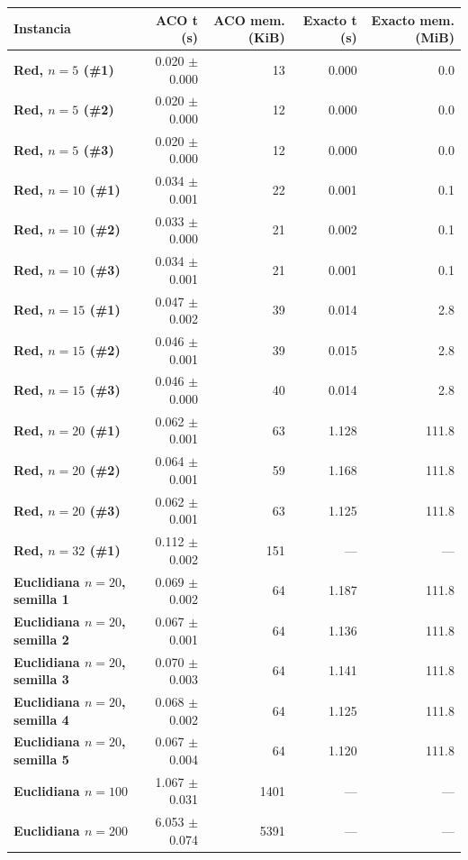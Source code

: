 \renewcommand{\arraystretch}{1.2}
\begin{tabular}{|l|r|r|r|r|}
\hline
\rowcolor{gray!20} \textbf{Instancia} & \textbf{ACO t (s)} & \textbf{ACO mem. (KiB)} & \textbf{Exacto t (s)} & \textbf{Exacto mem. (MiB)} \\
\hline
\textbf{Red, $n=5$ (\#1)} & 0.020 $\pm$ 0.000 & 13 & 0.000 & 0.0 \\
\hline
\textbf{Red, $n=5$ (\#2)} & 0.020 $\pm$ 0.000 & 12 & 0.000 & 0.0 \\
\hline
\textbf{Red, $n=5$ (\#3)} & 0.020 $\pm$ 0.000 & 12 & 0.000 & 0.0 \\
\hline
\textbf{Red, $n=10$ (\#1)} & 0.034 $\pm$ 0.001 & 22 & 0.001 & 0.1 \\
\hline
\textbf{Red, $n=10$ (\#2)} & 0.033 $\pm$ 0.000 & 21 & 0.002 & 0.1 \\
\hline
\textbf{Red, $n=10$ (\#3)} & 0.034 $\pm$ 0.001 & 21 & 0.001 & 0.1 \\
\hline
\textbf{Red, $n=15$ (\#1)} & 0.047 $\pm$ 0.002 & 39 & 0.014 & 2.8 \\
\hline
\textbf{Red, $n=15$ (\#2)} & 0.046 $\pm$ 0.001 & 39 & 0.015 & 2.8 \\
\hline
\textbf{Red, $n=15$ (\#3)} & 0.046 $\pm$ 0.000 & 40 & 0.014 & 2.8 \\
\hline
\textbf{Red, $n=20$ (\#1)} & 0.062 $\pm$ 0.001 & 63 & 1.128 & 111.8 \\
\hline
\textbf{Red, $n=20$ (\#2)} & 0.064 $\pm$ 0.001 & 59 & 1.168 & 111.8 \\
\hline
\textbf{Red, $n=20$ (\#3)} & 0.062 $\pm$ 0.001 & 63 & 1.125 & 111.8 \\
\hline
\textbf{Red, $n=32$ (\#1)} & 0.112 $\pm$ 0.002 & 151 & --- & --- \\
\hline
\textbf{Euclidiana $n=20$, semilla 1} & 0.069 $\pm$ 0.002 & 64 & 1.187 & 111.8 \\
\hline
\textbf{Euclidiana $n=20$, semilla 2} & 0.067 $\pm$ 0.001 & 64 & 1.136 & 111.8 \\
\hline
\textbf{Euclidiana $n=20$, semilla 3} & 0.070 $\pm$ 0.003 & 64 & 1.141 & 111.8 \\
\hline
\textbf{Euclidiana $n=20$, semilla 4} & 0.068 $\pm$ 0.002 & 64 & 1.125 & 111.8 \\
\hline
\textbf{Euclidiana $n=20$, semilla 5} & 0.067 $\pm$ 0.004 & 64 & 1.120 & 111.8 \\
\hline
\textbf{Euclidiana $n=100$} & 1.067 $\pm$ 0.031 & 1401 & --- & --- \\
\hline
\textbf{Euclidiana $n=200$} & 6.053 $\pm$ 0.074 & 5391 & --- & --- \\
\hline
\end{tabular}
